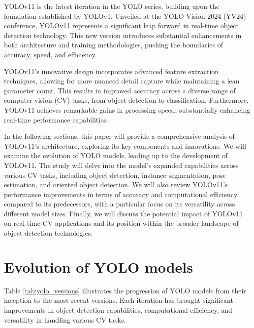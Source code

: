 \documentclass{article}
\begin{document}
YOLOv11 is the latest iteration in the YOLO series, building upon the foundation established by YOLOv1. Unveiled at the YOLO Vision 2024 (YV24) conference, YOLOv11 represents a significant leap forward in real-time object detection technology. This new version introduces substantial enhancements in both architecture and training methodologies, pushing the boundaries of accuracy, speed, and efficiency.

YOLOv11's innovative design incorporates advanced feature extraction techniques, allowing for more nuanced detail capture while maintaining a lean parameter count. This results in improved accuracy across a diverse range of computer vision (CV) tasks, from object detection to classification. Furthermore, YOLOv11 achieves remarkable gains in processing speed, substantially enhancing real-time performance capabilities.

In the following sections, this paper will provide a comprehensive analysis of YOLOv11's architecture, exploring its key components and innovations. We will examine the evolution of YOLO models, leading up to the development of YOLOv11. The study will delve into the model's expanded capabilities across various CV tasks, including object detection, instance segmentation, pose estimation, and oriented object detection. We will also review YOLOv11's performance improvements in terms of accuracy and computational efficiency compared to its predecessors, with a particular focus on its versatility across different model sizes. Finally, we will discuss the potential impact of YOLOv11 on real-time CV applications and its position within the broader landscape of object detection technologies.


\section{Evolution of YOLO models}
Table \ref{tab:yolo_versions} illustrates the progression of YOLO models from their inception to the most recent versions. Each iteration has brought significant improvements in object detection capabilities, computational efficiency, and versatility in handling various CV tasks.
\end{document}

